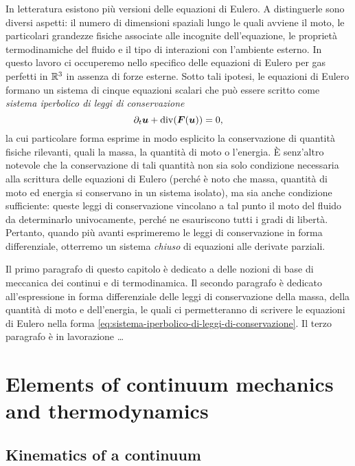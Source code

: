 In letteratura esistono più versioni delle equazioni di Eulero.
A distinguerle sono diversi aspetti:
il numero di dimensioni spaziali lungo le quali avviene il moto,
le particolari grandezze fisiche associate alle incognite dell'equazione,
le proprietà termodinamiche del fluido
e il tipo di interazioni con l'ambiente esterno.
In questo lavoro ci occuperemo nello specifico delle
equazioni di Eulero per gas perfetti in $\mathbb{R}^3$ in assenza di forze esterne.
Sotto tali ipotesi, le equazioni di Eulero formano un sistema di
cinque equazioni scalari che può essere scritto come
\emph{sistema iperbolico di leggi di conservazione}
\begin{equation} \label{eq:sistema-iperbolico-di-leggi-di-conservazione}
\partial_t \bm{u} + \operatorname{div}(\bm{F}(\bm{u})) = 0,
\end{equation}
la cui particolare forma esprime in modo esplicito
la conservazione di quantità fisiche rilevanti,
quali la massa, la quantità di moto o l'energia.
È senz'altro notevole che la conservazione di tali quantità
non sia solo condizione necessaria alla scrittura delle equazioni
di Eulero (perché è noto che massa, quantità di moto
ed energia si conservano in un sistema isolato),
ma sia anche condizione sufficiente: queste leggi
di conservazione vincolano a tal punto il moto del fluido
da determinarlo univocamente, perché ne esauriscono tutti i gradi
di libertà.
Pertanto, quando più avanti esprimeremo le leggi di conservazione
in forma differenziale, otterremo un sistema \emph{chiuso} di equazioni
alle derivate parziali.

Il primo paragrafo di questo capitolo è dedicato a delle nozioni di base
di meccanica dei continui e di termodinamica.
Il secondo paragrafo è dedicato all'espressione in forma differenziale
delle leggi di conservazione della massa, della quantità di moto e
dell'energia, le quali ci permetteranno di scrivere le equazioni di Eulero
nella forma \eqref{eq:sistema-iperbolico-di-leggi-di-conservazione}.
Il terzo paragrafo è in lavorazione \dots

\section{Elements of continuum mechanics and thermodynamics}

\subsection*{Kinematics of a continuum}


